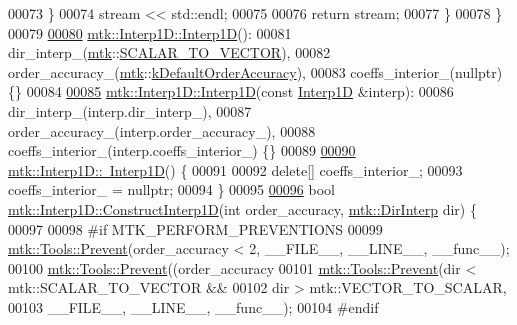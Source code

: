 \begin{DoxyCode}
00073   \}
00074   stream << std::endl;
00075 
00076   \textcolor{keywordflow}{return} stream;
00077 \}
00078 \}
00079 
\hypertarget{mtk__interp__1d_8cc_source_l00080}{}\hyperlink{classmtk_1_1Interp1D_ae56f90c53579c91c1dbe715f7e7361be}{00080} \hyperlink{classmtk_1_1Interp1D_ae56f90c53579c91c1dbe715f7e7361be}{mtk::Interp1D::Interp1D}():
00081   dir\_interp\_(\hyperlink{namespacemtk}{mtk}::\hyperlink{namespacemtk_ga674ec67bd1baa04e5dc06c2bcc351972a53facfbeb6725b2bd220c8d9811a0673}{SCALAR\_TO\_VECTOR}),
00082   order\_accuracy\_(\hyperlink{namespacemtk}{mtk}::\hyperlink{group__c01-roots_ga0d95560098eb36420511103637b6952f}{kDefaultOrderAccuracy}),
00083   coeffs\_interior\_(nullptr) \{\}
00084 
\hypertarget{mtk__interp__1d_8cc_source_l00085}{}\hyperlink{classmtk_1_1Interp1D_a92a5ed77144b3824d201a586f4072fd0}{00085} \hyperlink{classmtk_1_1Interp1D_ae56f90c53579c91c1dbe715f7e7361be}{mtk::Interp1D::Interp1D}(\textcolor{keyword}{const} \hyperlink{classmtk_1_1Interp1D}{Interp1D} &interp):
00086   dir\_interp\_(interp.dir\_interp\_),
00087   order\_accuracy\_(interp.order\_accuracy\_),
00088   coeffs\_interior\_(interp.coeffs\_interior\_) \{\}
00089 
\hypertarget{mtk__interp__1d_8cc_source_l00090}{}\hyperlink{classmtk_1_1Interp1D_a52ea06b5e3d7082eb06ade256f4e30fb}{00090} \hyperlink{classmtk_1_1Interp1D_a52ea06b5e3d7082eb06ade256f4e30fb}{mtk::Interp1D::~Interp1D}() \{
00091 
00092   \textcolor{keyword}{delete}[] coeffs\_interior\_;
00093   coeffs\_interior\_ = \textcolor{keyword}{nullptr};
00094 \}
00095 
\hypertarget{mtk__interp__1d_8cc_source_l00096}{}\hyperlink{classmtk_1_1Interp1D_ab1c8e12534886aa185b24be474d1056e}{00096} \textcolor{keywordtype}{bool} \hyperlink{classmtk_1_1Interp1D_ab1c8e12534886aa185b24be474d1056e}{mtk::Interp1D::ConstructInterp1D}(\textcolor{keywordtype}{int} order\_accuracy, 
      \hyperlink{group__c02-enums_ga674ec67bd1baa04e5dc06c2bcc351972}{mtk::DirInterp} dir) \{
00097 
00098 \textcolor{preprocessor}{  #if MTK\_PERFORM\_PREVENTIONS}
00099   \hyperlink{classmtk_1_1Tools_a332324c6f25e66be9dff48c5987a3b9f}{mtk::Tools::Prevent}(order\_accuracy < 2, \_\_FILE\_\_, \_\_LINE\_\_, \_\_func\_\_);
00100   \hyperlink{classmtk_1_1Tools_a332324c6f25e66be9dff48c5987a3b9f}{mtk::Tools::Prevent}((order\_accuracy%
00101   \hyperlink{classmtk_1_1Tools_a332324c6f25e66be9dff48c5987a3b9f}{mtk::Tools::Prevent}(dir < mtk::SCALAR\_TO\_VECTOR &&
00102                       dir > mtk::VECTOR\_TO\_SCALAR,
00103                       \_\_FILE\_\_, \_\_LINE\_\_, \_\_func\_\_);
00104 \textcolor{preprocessor}{  #endif}

\end{DoxyCode}
